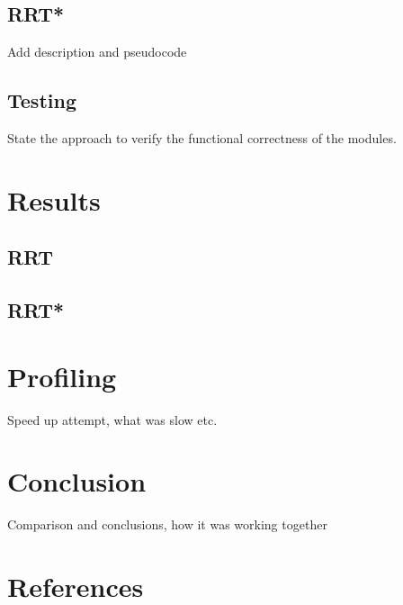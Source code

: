 \documentclass[10pt]{article}
\begin{document}
\subsection{RRT*}
Add description and pseudocode 

\subsection{Testing}
State the approach to verify the functional correctness of the modules.

\section{Results}
\subsection{RRT}
\subsection{RRT*}

\section{Profiling}
Speed up attempt, what was slow etc. 

\section{Conclusion}
Comparison and conclusions, how it was working together

\section{References}
\end{document}
